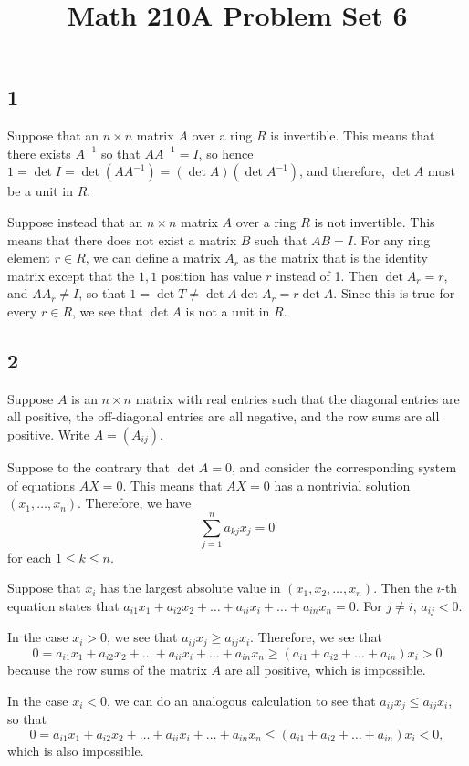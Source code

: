 \documentclass[12pt, reqno]{amsart}
\begin{document}
\title{Math 210A Problem Set 6}


\subsection*{1}

Suppose that an $n \times n$ matrix $A$ over a ring $R$ is invertible. This
means that there exists $A^{-1}$ so that $A A^{-1} = I$, so hence
$1 = \det I = \det(A A^{-1}) = (\det A) (\det A^{-1})$, and therefore, 
$\det A$ must be a unit in $R$.

Suppose instead that an $n \times n$ matrix $A$ over a ring $R$ is not
invertible. This means that there does not exist a matrix $B$ such that 
$A B = I$. For any ring element $r \in R$, we can define a matrix $A_r$ as the
matrix that is the identity matrix except that the $1,1$ position has value $r$
instead of 1. Then $\det A_r = r$, and $A A_r \ne I$, so that
$1 = \det T \ne \det A \det A_r = r \det A$. Since this is true for every $r
\in R$, we see that $\det A$ is not a unit in $R$.


\subsection*{2}

Suppose $A$ is an $n \times n$ matrix with real entries such that the diagonal
entries are all positive, the off-diagonal entries are all negative, and the
row sums are all positive. Write $A = (A_{ij})$.

Suppose to the contrary that $\det A = 0$, and consider the corresponding
system of equations $AX = 0$. This means that $AX = 0$ has a nontrivial
solution $(x_1, \dots, x_n)$. Therefore, we have
\[ 
\sum_{j=1}^n a_{kj} x_j = 0
\] 
for each $1 \le k \le n$.

Suppose that $x_i$ has the largest absolute value in $(x_1, x_2, \dots, x_n)$.
Then the $i$-th equation states that 
$a_{i1} x_1 + a_{i2} x_2 + \dots + a_{ii}x_i + \dots + a_{in} x_n = 0$.
For $j \ne i$, $a_{ij} < 0$. 

In the case $x_i > 0$, we see that 
$a_{ij} x_j \ge a_{ij} x_i$. 
Therefore, we see that 
$$
0 = a_{i1} x_1 + a_{i2} x_2 + \dots + a_{ii}x_i + \dots + a_{in} x_n
\ge (a_{i1} + a_{i2} + \dots + a_{in}) x_i > 0
$$
because the row sums of the matrix $A$ are all positive,
which is impossible.

In the case $x_i < 0$, we can do an analogous calculation to see that
$a_{ij} x_j \le a_{ij} x_i$, so that 
$$
0 = a_{i1} x_1 + a_{i2} x_2 + \dots + a_{ii}x_i + \dots + a_{in} x_n
\le (a_{i1} + a_{i2} + \dots + a_{in}) x_i < 0, 
$$
which is also impossible.
\end{document}
